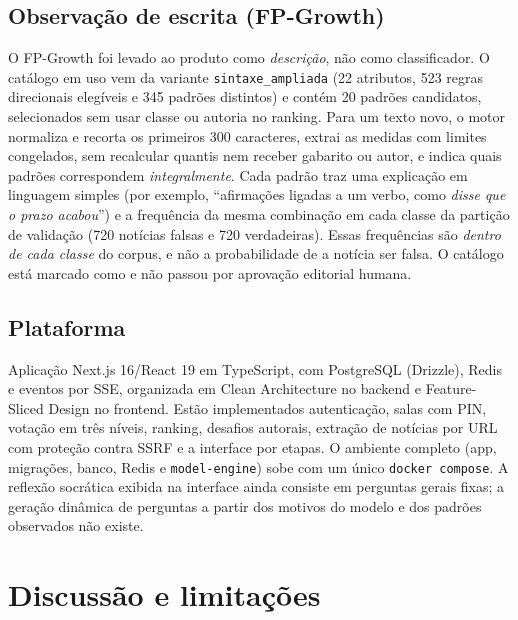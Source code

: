 \documentclass[brazilian,11pt,a4paper]{article}
\begin{document}
\subsection{Observação de escrita (FP-Growth)}

O FP-Growth foi levado ao produto como \emph{descrição}, não como classificador. O catálogo em uso vem da variante \texttt{sintaxe\_ampliada} (22 atributos, 523 regras direcionais elegíveis e 345 padrões distintos) e contém 20 padrões candidatos, selecionados sem usar classe ou autoria no ranking. Para um texto novo, o motor normaliza e recorta os primeiros 300 caracteres, extrai as medidas com limites congelados, sem recalcular quantis nem receber gabarito ou autor, e indica quais padrões correspondem \emph{integralmente}. Cada padrão traz uma explicação em linguagem simples (por exemplo, ``afirmações ligadas a um verbo, como \emph{disse que o prazo acabou}'') e a frequência da mesma combinação em cada classe da partição de validação (720 notícias falsas e 720 verdadeiras). Essas frequências são \emph{dentro de cada classe} do corpus, e não a probabilidade de a notícia ser falsa. O catálogo está marcado como  e não passou por aprovação editorial humana.

\subsection{Plataforma}

Aplicação Next.js 16/React 19 em TypeScript, com PostgreSQL (Drizzle), Redis e eventos por SSE, organizada em Clean Architecture no backend e Feature-Sliced Design no frontend. Estão implementados autenticação, salas com PIN, votação em três níveis, ranking, desafios autorais, extração de notícias por URL com proteção contra SSRF e a interface por etapas. O ambiente completo (app, migrações, banco, Redis e \texttt{model-engine}) sobe com um único \texttt{docker compose}. A reflexão socrática exibida na interface ainda consiste em perguntas gerais fixas; a geração dinâmica de perguntas a partir dos motivos do modelo e dos padrões observados não existe.

\section{Discussão e limitações}
\end{document}
